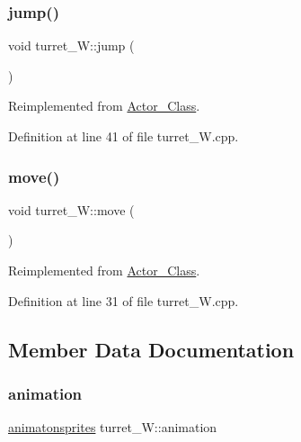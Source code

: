 \subsubsection{\texorpdfstring{jump()}{jump()}}
{\footnotesize\ttfamily void turret\+\_\+\+W\+::jump (\begin{DoxyParamCaption}{ }\end{DoxyParamCaption})\hspace{0.3cm}{\ttfamily [virtual]}}



Reimplemented from \hyperlink{class_actor___class_ab33216a3ce0c856bdc16231c71ae35c2}{Actor\+\_\+\+Class}.



Definition at line 41 of file turret\+\_\+\+W.\+cpp.

\hypertarget{classturret___w_a3d06d812bd3f9905a2965372478f9ebd}{}\label{classturret___w_a3d06d812bd3f9905a2965372478f9ebd} 
\subsubsection{\texorpdfstring{move()}{move()}}
{\footnotesize\ttfamily void turret\+\_\+\+W\+::move (\begin{DoxyParamCaption}{ }\end{DoxyParamCaption})\hspace{0.3cm}{\ttfamily [virtual]}}



Reimplemented from \hyperlink{class_actor___class_af1764a94c5410ba8476f56553cd2c327}{Actor\+\_\+\+Class}.



Definition at line 31 of file turret\+\_\+\+W.\+cpp.



\subsection{Member Data Documentation}
\hypertarget{classturret___w_aa5e92e624406182b1b93ad3c35bf5da5}{}\label{classturret___w_aa5e92e624406182b1b93ad3c35bf5da5} 
\subsubsection{\texorpdfstring{animation}{animation}}
{\footnotesize\ttfamily \hyperlink{classanimatonsprites}{animatonsprites} turret\+\_\+\+W\+::animation}



